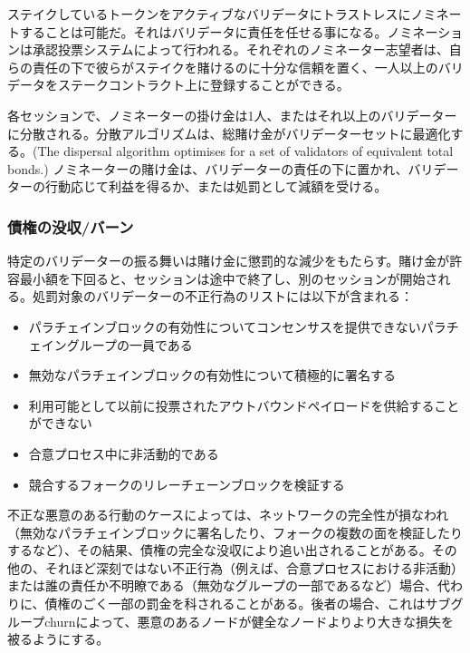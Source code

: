 ステイクしているトークンをアクティブなバリデータにトラストレスにノミネートすることは可能だ。それはバリデータに責任を任せる事になる。ノミネーションは承認投票システムによって行われる。それぞれのノミネーター志望者は、自らの責任の下で彼らがステイクを賭けるのに十分な信頼を置く、一人以上のバリデータをステークコントラクト上に登録することができる。

各セッションで、ノミネーターの掛け金は1人、またはそれ以上のバリデーターに分散される。分散アルゴリズムは、総賭け金がバリデーターセットに最適化する。(The
dispersal algorithm optimises for a set of validators of equivalent
total bonds.)
ノミネーターの賭け金は、バリデーターの責任の下に置かれ、バリデーターの行動応じて利益を得るか、または処罰として減額を受ける。

\hypertarget{ux50b5ux6a29ux306eux6ca1ux53ceux30d0ux30fcux30f3}{%
\subsubsection{債権の没収/バーン}\label{ux50b5ux6a29ux306eux6ca1ux53ceux30d0ux30fcux30f3}}

特定のバリデーターの振る舞いは賭け金に懲罰的な減少をもたらす。賭け金が許容最小額を下回ると、セッションは途中で終了し、別のセッションが開始される。処罰対象のバリデーターの不正行為のリストには以下が含まれる：

\begin{itemize}
\tightlist
\item
  パラチェインブロックの有効性についてコンセンサスを提供できないパラチェイングループの一員である
\item
  無効なパラチェインブロックの有効性について積極的に署名する
\item
  利用可能として以前に投票されたアウトバウンドペイロードを供給することができない
\item
  合意プロセス中に非活動的である
\item
  競合するフォークのリレーチェーンブロックを検証する
\end{itemize}

不正な悪意のある行動のケースによっては、ネットワークの完全性が損なわれ（無効なパラチェインブロックに署名したり、フォークの複数の面を検証したりするなど）、その結果、債権の完全な没収により追い出されることがある。その他の、それほど深刻ではない不正行為（例えば、合意プロセスにおける非活動）または誰の責任か不明瞭である（無効なグループの一部であるなど）場合、代わりに、債権のごく一部の罰金を科されることがある。後者の場合、これはサブグループchurnによって、悪意のあるノードが健全なノードよりより大きな損失を被るようにする。

